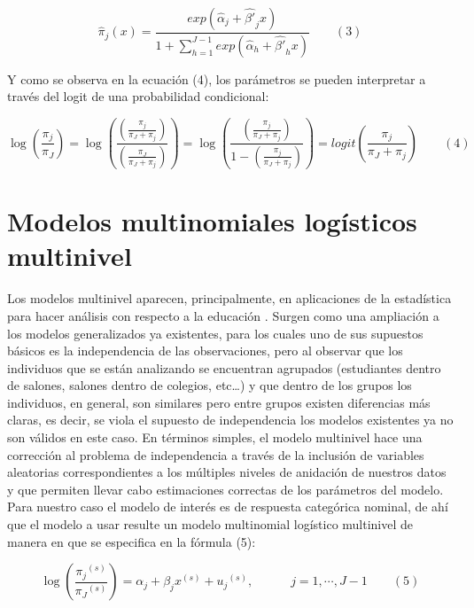 \documentclass[]{book}
\theoremstyle{definition}
\theoremstyle{definition}
\theoremstyle{definition}
\theoremstyle{remark}
\begin{document}
\[{ \hat { \pi  }  }_{ j }(x)=\frac { exp({ \hat { \alpha  }  }_{ j }+{ \hat { \beta ' }  }_{ j }x) }{ 1+\sum _{ h=1 }^{ J-1 }{ exp({ \hat { \alpha  }  }_{ h }+{ \hat { \beta ' }  }_{ h }x) }  } \quad \quad (3)\]

Y como se observa en la ecuación (4), los parámetros se pueden
interpretar a través del logit de una probabilidad condicional:

\[\log { \left( \frac { { \pi  }_{ j } }{ { \pi  }_{ J } }  \right)  } =\log { \left( \frac { \left( \frac { { \pi  }_{ j } }{ { \pi  }_{ J }+{ \pi  }_{ j } }  \right)  }{ \left( \frac { { \pi  }_{ J } }{ { \pi  }_{ J }+{ \pi  }_{ j } }  \right)  }  \right)  } =\log { \left( \frac { \left( \frac { { \pi  }_{ j } }{ { \pi  }_{ J }+{ \pi  }_{ j } }  \right)  }{ 1-\left( \frac { { \pi  }_{ j } }{ { \pi  }_{ J }+{ \pi  }_{ j } }  \right)  }  \right)  } =logit\left( \frac { { \pi  }_{ j } }{ { \pi  }_{ J }+{ \pi  }_{ j } }  \right) \quad \quad (4)\]

\section{Modelos multinomiales logísticos
multinivel}\label{modelos-multinomiales-logisticos-multinivel}

Los modelos multinivel aparecen, principalmente, en aplicaciones de la
estadística para hacer análisis con respecto a la educación
\citep{Goldstein}. Surgen como una ampliación a los modelos
generalizados ya existentes, para los cuales uno de sus supuestos
básicos es la independencia de las observaciones, pero al observar que
los individuos que se están analizando se encuentran agrupados
(estudiantes dentro de salones, salones dentro de colegios, etc\ldots{})
y que dentro de los grupos los individuos, en general, son similares
pero entre grupos existen diferencias más claras, es decir, se viola el
supuesto de independencia los modelos existentes ya no son válidos en
este caso. En términos simples, el modelo multinivel hace una corrección
al problema de independencia a través de la inclusión de variables
aleatorias correspondientes a los múltiples niveles de anidación de
nuestros datos y que permiten llevar cabo estimaciones correctas de los
parámetros del modelo. Para nuestro caso el modelo de interés es de
respuesta categórica nominal, de ahí que el modelo a usar resulte un
modelo multinomial logístico multinivel \citep{Goldstein} de manera en
que se especifica en la fórmula (5):

\[\log { \left( \frac { { { \pi  }_{ j } }^{ (s) } }{ { { \pi  }_{ J } }^{ (s) } }  \right)  } ={ \alpha  }_{ j }+{ \beta  }_{ j }{ x }^{ (s) }+{ { u }_{ j } }^{ (s) },\quad \quad \quad j=1,\cdots ,J-1\quad \quad (5)\]
\end{document}
